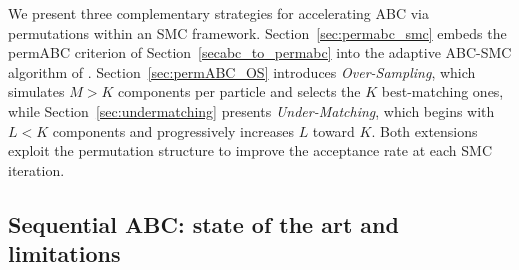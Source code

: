 We present three complementary strategies for accelerating ABC via permutations within an SMC framework.
Section~\ref{sec:permabc_smc} embeds the permABC criterion of Section~\ref{secabc_to_permabc} into the adaptive ABC-SMC algorithm of \citet{delmoralAdaptiveSequentialMonte2012}.
Section~\ref{sec:permABC_OS} introduces \emph{Over-Sampling}, which simulates $M > K$ components per particle and selects the $K$ best-matching ones, while Section~\ref{sec:undermatching} presents \emph{Under-Matching}, which begins with $L < K$ components and progressively increases $L$ toward $K$.
Both extensions exploit the permutation structure to improve the acceptance rate at each SMC iteration.

\subsection{Sequential ABC: state of the art and limitations}
\label{sec:abc_smc}
